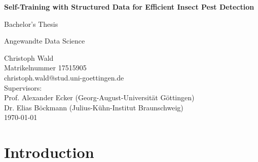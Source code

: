 \documentclass[12pt, a4paper]{article}
\begin{document}
\begin{titlepage}
 \vspace*{\fill}
    \centering
    {\Huge\bfseries Self-Training with Structured Data for Efficient Insect Pest Detection\par}
    \vspace{1cm}
{\LARGE Bachelor’s Thesis\par}
{\large Angewandte Data Science}
    \vspace{1cm}
    
    \centering
    {\large
    Christoph Wald\\
    Matrikelnummer 17515905\\
    christoph.wald@stud.uni-goettingen.de\\
    \vspace{1\baselineskip}
    Supervisors: \\
    Prof. Alexander Ecker (Georg-August-Universität Göttingen)\\
    Dr. Elias Böckmann (Julius-Kühn-Institut Braunschweig)\\
    \vspace{1\baselineskip}
    {\today}\\
    }

     \vspace*{\fill}
\end{titlepage}

\newpage
\tableofcontents
\newpage

\section{Introduction}
\end{document}
